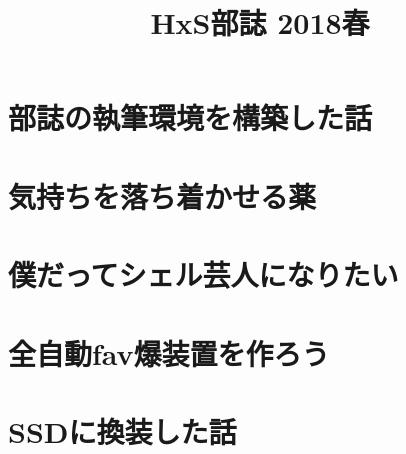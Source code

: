 \documentclass[10.5pt,a4paper]{jsbook}
\title{HxS部誌 2018春}
\date{}
\begin{document}
\maketitle
\tableofcontents

\chapter{部誌の執筆環境を構築した話}


\chapter{気持ちを落ち着かせる薬}


\chapter{僕だってシェル芸人になりたい}


\chapter{全自動fav爆装置を作ろう}


\chapter{SSDに換装した話}

\end{document}
